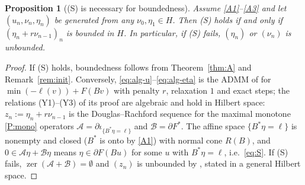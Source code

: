 \documentclass[11pt]{amsart}
\newtheorem{proposition}[theorem]{Proposition}
\theoremstyle{definition}
\theoremstyle{remark}
\numberwithin{equation}{section}
\begin{document}
\begin{proposition}[(S) is necessary for boundedness]\label{prop:unbounded}
Assume \ref{A1}--\ref{A3} and let $(u_n,\nu_n,\eta_n)$ be generated from any $\nu_0,\eta_1\in H$. Then \textup{(S)} holds if and only if $(\eta_n+r\nu_{n-1})_n$ is bounded in $H$. In particular, if \textup{(S)} fails, $(\eta_n)$ or $(\nu_n)$ is unbounded.
\end{proposition}
\begin{proof}
If (S) holds, boundedness follows from Theorem~\ref{thm:A} and Remark~\ref{rem:init}. Conversely, \eqref{eq:alg-u}--\eqref{eq:alg-eta} is the ADMM of \cite[Thm.~8]{EcksteinBertsekas1992} for $\min(-\ell(v))+F(Bv)$ with penalty $r$, relaxation $1$ and exact steps; the relations (Y1)--(Y3) of its proof are algebraic and hold in Hilbert space: $z_n:=\eta_n+r\nu_{n-1}$ is the Douglas--Rachford sequence for the maximal monotone \ref{P:mono} operators $\mathcal A=\partial\iota_{\{B^*\eta=\ell\}}$ and $\mathcal B=\partial F^*$. The affine space $\{B^*\eta=\ell\}$ is nonempty and closed ($B^*$ is onto by \ref{A1}) with normal cone $R(B)$, and $0\in\mathcal A\eta+\mathcal B\eta$ means $\eta\in\partial F(Bu)$ for some $u$ with $B^*\eta=\ell$, i.e.\ \eqref{eq:S}. If (S) fails, $\operatorname{zer}(\mathcal A+\mathcal B)=\emptyset$ and $(z_n)$ is unbounded by \cite[Thm.~7]{EcksteinBertsekas1992}, stated in a general Hilbert space.
\end{proof}
\end{document}

